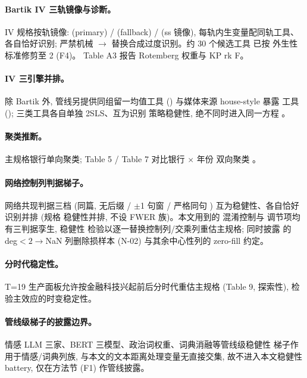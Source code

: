 \paragraph{Bartik IV 三轨镜像与诊断。}
IV 规格按轨镜像:  (primary) /
 (fallback) / 
(ss 镜像), 每轨内生变量配同轨工具、各自恰好识别; 严禁机械
$\to$ 替换合成过度识别。约 30 个候选工具
已按 \textcite{goldsmith2020bartik} 外生性标准修剪至 2 (F4)。
Table A3 报告 Rotemberg 权重与 KP rk F。

\paragraph{IV 三引擎并排。}
除 Bartik 外, 管线另提供同组留一均值工具
() 与媒体来源 house-style 暴露
工具 (); 三类工具各自单独 2SLS、互为识别
策略稳健性, 绝不同时进入同一方程
\parencite{borusyak2025shiftshareguide}。

\paragraph{聚类推断。}
主规格银行单向聚类; Table 5 / Table 7 对比银行 $\times$ 年份
双向聚类 \parencite{cameron2015practitioner}。

\paragraph{网络控制列判据梯子。}
网络共现判据三档 (同篇, 无后缀 / $\pm$1 句窗  /
严格同句 ) 互为稳健性、各自恰好识别并排 (规格
稳健性并排, 不设 FWER 族)。本文用到的 
混淆控制与  调节项均有三判据孪生, 稳健性
检验以逐一替换控制列/交乘列重估主规格; 同时披露
 的 deg$<2\to$NaN 列删除损样本 (N-02)
与其余中心性列的 zero-fill 约定。

\paragraph{分时代稳定性。}
T=19 生产面板允许按金融科技兴起前后分时代重估主规格
(Table 9, 探索性), 检验主效应的时变稳定性。

\paragraph{管线级梯子的披露边界。}
情感 LLM 三家、BERT 三模型、政治词权重、词典消融等管线级稳健性
梯子作用于情感/词典列族, 与本文的文本距离处理变量无直接交集,
故不进入本文稳健性 battery, 仅在方法节 (F1) 作管线披露。

